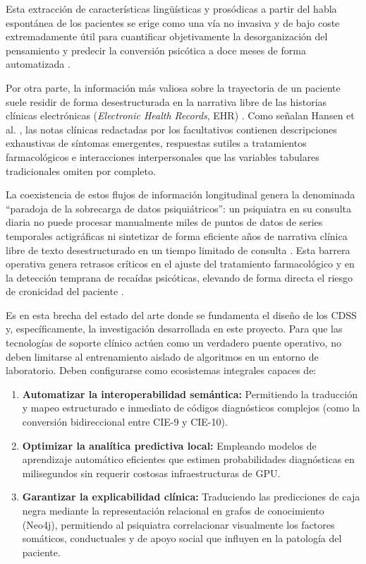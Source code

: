 \documentclass[12pt,a4paper,onecolumn,oneside]{report}
\begin{document}
Esta extracción de características lingüísticas y prosódicas a partir del habla espontánea de los pacientes se erige como una vía no invasiva y de bajo coste extremadamente útil para cuantificar objetivamente la desorganización del pensamiento y predecir la conversión psicótica a doce meses de forma automatizada \cite{lai2021schizophrenia, Tyagi}.

Por otra parte, la información más valiosa sobre la trayectoria de un paciente suele residir de forma desestructurada en la narrativa libre de las historias clínicas electrónicas (\textit{Electronic Health Records}, EHR) \cite{hansen2025predicting}. Como señalan Hansen et al. \cite{hansen2025predicting}, las notas clínicas redactadas por los facultativos contienen descripciones exhaustivas de síntomas emergentes, respuestas sutiles a tratamientos farmacológicos e interacciones interpersonales que las variables tabulares tradicionales omiten por completo.

La coexistencia de estos flujos de información longitudinal genera la denominada ``paradoja de la sobrecarga de datos psiquiátricos'': un psiquiatra en su consulta diaria no puede procesar manualmente miles de puntos de datos de series temporales actigráficas ni sintetizar de forma eficiente años de narrativa clínica libre de texto desestructurado en un tiempo limitado de consulta \cite{hansen2025predicting}. Esta barrera operativa genera retrasos críticos en el ajuste del tratamiento farmacológico y en la detección temprana de recaídas psicóticas, elevando de forma directa el riesgo de cronicidad del paciente \cite{zapata2015psicoeducacion, hansen2025predicting}.

Es en esta brecha del estado del arte donde se fundamenta el diseño de los CDSS y, específicamente, la investigación desarrollada en este proyecto. Para que las tecnologías de soporte clínico actúen como un verdadero puente operativo, no deben limitarse al entrenamiento aislado de algoritmos en un entorno de laboratorio. Deben configurarse como ecosistemas integrales capaces de:
\begin{enumerate}
    \item \textbf{Automatizar la interoperabilidad semántica:} Permitiendo la traducción y mapeo estructurado e inmediato de códigos diagnósticos complejos (como la conversión bidireccional entre CIE-9 y CIE-10).
    \item \textbf{Optimizar la analítica predictiva local:} Empleando modelos de aprendizaje automático eficientes que estimen probabilidades diagnósticas en milisegundos sin requerir costosas infraestructuras de GPU.
    \item \textbf{Garantizar la explicabilidad clínica:} Traduciendo las predicciones de caja negra mediante la representación relacional en grafos de conocimiento (Neo4j), permitiendo al psiquiatra correlacionar visualmente los factores somáticos, conductuales y de apoyo social que influyen en la patología del paciente.
\end{enumerate}
\end{document}

